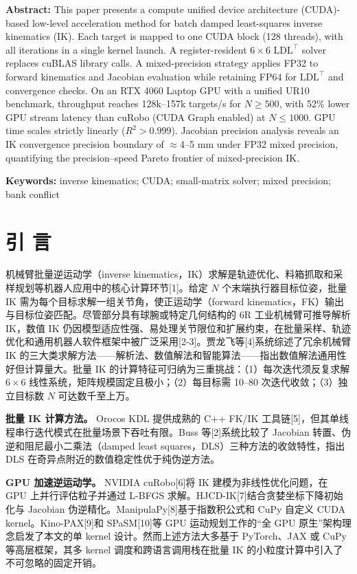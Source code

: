 \documentclass[twocolumn,a4paper,10pt]{ctexart}
\begin{document}
\vspace{2mm}
{\bfseries Abstract:} This paper presents a compute unified device architecture (CUDA)-based low-level acceleration method for batch damped least-squares inverse kinematics (IK). Each target is mapped to one CUDA block (128 threads), with all iterations in a single kernel launch. A register-resident $6\times6$ $\mathrm{LDL}^\top$ solver replaces cuBLAS library calls. A mixed-precision strategy applies FP32 to forward kinematics and Jacobian evaluation while retaining FP64 for $\mathrm{LDL}^\top$ and convergence checks. On an RTX 4060 Laptop GPU with a unified UR10 benchmark, throughput reaches 128k--157k targets/s for $N\ge500$, with 52\% lower GPU stream latency than cuRobo (CUDA Graph enabled) at $N\le1000$. GPU time scales strictly linearly ($R^2>0.999$). Jacobian precision analysis reveals an IK convergence precision boundary of $\approx$4--5 mm under FP32 mixed precision, quantifying the precision--speed Pareto frontier of mixed-precision IK.

\vspace{1mm}
{\bfseries Keywords:} inverse kinematics; CUDA; small-matrix solver; mixed precision; bank conflict

\setcounter{section}{-1}
\section{引 言}

机械臂批量逆运动学（inverse kinematics，IK）求解是轨迹优化、料箱抓取和采样规划等机器人应用中的核心计算环节[1]。给定 $N$ 个末端执行器目标位姿，批量 IK 需为每个目标求解一组关节角，使正运动学（forward kinematics，FK）输出与目标位姿匹配。尽管部分具有球腕或特定几何结构的 6R 工业机械臂可推导解析 IK，数值 IK 仍因模型适应性强、易处理关节限位和扩展约束，在批量采样、轨迹优化和通用机器人软件框架中被广泛采用[2-3]。贾龙飞等[4]系统综述了冗余机械臂 IK 的三大类求解方法——解析法、数值解法和智能算法——指出数值解法通用性好但计算量大。批量 IK 的计算特征可归纳为三重挑战：（1）每次迭代须反复求解 $6\times6$ 线性系统，矩阵规模固定且极小；（2）每目标需 10--80 次迭代收敛；（3）独立目标数 $N$ 可达数千至上万。

{\bfseries 批量 IK 计算方法。} Orocos KDL 提供成熟的 C++ FK/IK 工具链[5]，但其单线程串行迭代模式在批量场景下吞吐有限。Buss 等[2]系统比较了 Jacobian 转置、伪逆和阻尼最小二乘法（damped least squares，DLS）三种方法的收敛特性，指出 DLS 在奇异点附近的数值稳定性优于纯伪逆方法。

{\bfseries GPU 加速逆运动学。} NVIDIA cuRobo[6]将 IK 建模为非线性优化问题，在 GPU 上并行评估粒子并通过 L-BFGS 求解。HJCD-IK[7]结合贪婪坐标下降初始化与 Jacobian 伪逆精化。ManipulaPy[8]基于指数积公式和 CuPy 自定义 CUDA kernel。Kino-PAX[9]和 SPaSM[10]等 GPU 运动规划工作的``全 GPU 原生''架构理念启发了本文的单 kernel 设计。然而上述方法大多基于 PyTorch、JAX 或 CuPy 等高层框架，其多 kernel 调度和跨语言调用栈在批量 IK 的小粒度计算中引入了不可忽略的固定开销。
\end{document}
